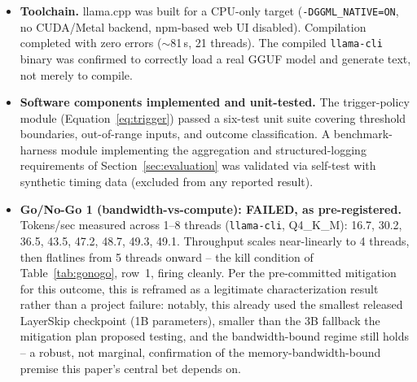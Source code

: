 \documentclass[journal]{IEEEtran}
\begin{document}
\begin{itemize}
    \item \textbf{Toolchain.} llama.cpp was built for a CPU-only target (\texttt{-DGGML\_NATIVE=ON}, no CUDA/Metal backend, npm-based web UI disabled). Compilation completed with zero errors ($\sim$81\,s, 21 threads). The compiled \texttt{llama-cli} binary was confirmed to correctly load a real GGUF model and generate text, not merely to compile.
    \item \textbf{Software components implemented and unit-tested.} The trigger-policy module (Equation~\ref{eq:trigger}) passed a six-test unit suite covering threshold boundaries, out-of-range inputs, and outcome classification. A benchmark-harness module implementing the aggregation and structured-logging requirements of Section~\ref{sec:evaluation} was validated via self-test with synthetic timing data (excluded from any reported result).
    \item \textbf{Go/No-Go 1 (bandwidth-vs-compute): FAILED, as pre-registered.} Tokens/sec measured across 1--8 threads (\texttt{llama-cli}, Q4\_K\_M): 16.7, 30.2, 36.5, 43.5, 47.2, 48.7, 49.3, 49.1. Throughput scales near-linearly to 4 threads, then flatlines from 5 threads onward -- the kill condition of Table~\ref{tab:gonogo}, row~1, firing cleanly. Per the pre-committed mitigation for this outcome, this is reframed as a legitimate characterization result rather than a project failure: notably, this already used the smallest released LayerSkip checkpoint (1B parameters), smaller than the 3B fallback the mitigation plan proposed testing, and the bandwidth-bound regime still holds -- a robust, not marginal, confirmation of the memory-bandwidth-bound premise this paper's central bet depends on.

\end{itemize}
\end{document}
